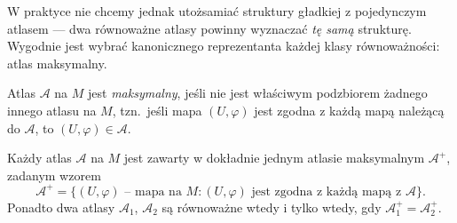 W praktyce nie chcemy jednak utożsamiać struktury gładkiej z pojedynczym atlasem — dwa
równoważne atlasy powinny wyznaczać \emph{tę samą} strukturę. Wygodnie jest wybrać
kanonicznego reprezentanta każdej klasy równoważności: atlas maksymalny.

\begin{definicja}
Atlas $\mathcal{A}$ na $M$ jest \emph{maksymalny}, jeśli nie jest właściwym podzbiorem
żadnego innego atlasu na $M$, tzn.\ jeśli mapa $(U,\varphi)$ jest zgodna z każdą mapą
należącą do $\mathcal{A}$, to $(U,\varphi)\in\mathcal{A}$.
\end{definicja}

\begin{twierdzenie}\label{tw:atlas-maksymalny}
Każdy atlas $\mathcal{A}$ na $M$ jest zawarty w dokładnie jednym atlasie maksymalnym
$\mathcal{A}^+$, zadanym wzorem
\[
\mathcal{A}^+=\{(U,\varphi)\text{ -- mapa na }M : (U,\varphi)\text{ jest zgodna z każdą
mapą z }\mathcal{A}\}.
\]
Ponadto dwa atlasy $\mathcal{A}_1$, $\mathcal{A}_2$ są równoważne wtedy i tylko wtedy, gdy
$\mathcal{A}_1^+=\mathcal{A}_2^+$.
\end{twierdzenie}


